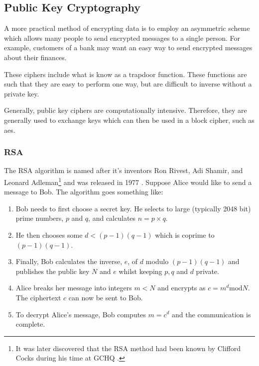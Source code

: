 \subsection{Public Key Cryptography}

A more practical method of encrypting data is to employ an asymmetric scheme which allows many people to send encrypted messages to a single person. For example, customers of a bank may want an easy way to send encrypted messages about their finances.

These ciphers include what is know as a {\color{bristol-red} trapdoor function}. These functions are such that they are easy to perform one way, but are difficult to inverse without a private key. 

Generally, public key ciphers are computationally intensive. Therefore, they are generally used to exchange keys which can then be used in a block cipher, such as \ac{aes}.

\subsubsection*{RSA}

The RSA algorithm is named after it's inventors Ron Rivest, Adi Shamir, and Leonard Adleman\footnote{It was later discovered that the RSA method had been known by Clifford Cocks during his time at GCHQ \cite{}.} and was released in 1977 \cite{}. Suppose Alice would like to send a message to Bob. The algorithm goes something like:

\begin{algorithm}
\begin{enumerate}
	\item Bob needs to first choose a secret key. He selects to large (typically 2048 bit) prime numbers, $p$ and $q$, and calculates $n = p \times q$.
	\item He then chooses some $d < (p-1)(q-1)$ which is coprime to $(p-1)(q-1)$.
	\item Finally, Bob calculates the inverse, $e$, of $d$ modulo $(p-1)(q-1)$ and publishes the public key $N$ and $e$ whilst keeping $p,q$ and $d$ private.
	\item Alice breaks her message into integers $m < N$ and encrypts as $c = m^d \mathrm{ mod } N$. The ciphertext $c$ can now be sent to Bob.
	\item To decrypt Alice's message, Bob computes $m = c^d$ and the communication is complete. 
\end{enumerate}   
\end{algorithm}

